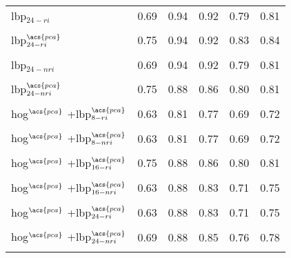 \begin{table*}
{\begin{tabular}{l ccccc}
  \acs{lbp}$_{24-ri}$ & 0.69 & 0.94 & 0.92 & 0.79 & 0.81\\
  \multicolumn{6}{c}{}\\[-1.5ex] 

  \acs{lbp}$_{24-ri}^{\acs{pca}}$ &  0.75 & 0.94 & 0.92 & 0.83 & 0.84\\
  \multicolumn{6}{c}{}\\[-1.5ex]  

  \acs{lbp}$_{24-nri}$ & 0.69 & 0.94 & 0.92 & 0.79 & 0.81\\
  \multicolumn{6}{c}{}\\[-1.5ex] 

  \acs{lbp}$_{24-nri}^{\acs{pca}}$ & 0.75 & 0.88 & 0.86 & 0.80 & 0.81\\
  \multicolumn{6}{c}{}\\[-1.5ex]       
  
   \acs{hog}$^{\acs{pca}}$ +\acs{lbp}$_{8-ri}^{\acs{pca}}$ & 0.63 & 0.81 & 0.77 & 0.69 & 0.72\\
  \multicolumn{6}{c}{}\\[-1.5ex]

   \acs{hog}$^{\acs{pca}}$ +\acs{lbp}$_{8-nri}^{\acs{pca}}$ & 0.63 & 0.81 & 0.77 & 0.69 & 0.72\\
  \multicolumn{6}{c}{}\\[-1.5ex]

   \acs{hog}$^{\acs{pca}}$ +\acs{lbp}$_{16-ri}^{\acs{pca}}$ & 0.75 & 0.88 & 0.86 & 0.80 & 0.81\\
  \multicolumn{6}{c}{}\\[-1.5ex]

  \acs{hog}$^{\acs{pca}}$ +\acs{lbp}$_{16-nri}^{\acs{pca}}$ & 0.63 & 0.88 & 0.83 & 0.71 & 0.75\\
  \multicolumn{6}{c}{}\\[-1.5ex]

 \acs{hog}$^{\acs{pca}}$ +\acs{lbp}$_{24-ri}^{\acs{pca}}$ & 0.63 & 0.88 & 0.83 & 0.71 & 0.75\\
  \multicolumn{6}{c}{}\\[-1.5ex]

  \acs{hog}$^{\acs{pca}}$ +\acs{lbp}$_{24-nri}^{\acs{pca}}$ & 0.69 & 0.88 & 0.85 & 0.76 & 0.78\\
  \multicolumn{6}{c}{}\\[-1.5ex]

\bottomrule
\end{tabular}}
\end{table*}

